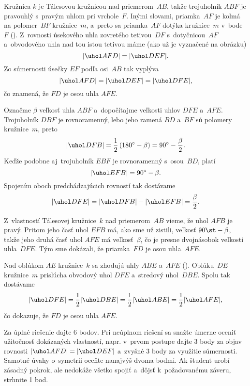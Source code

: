 {%
Kružnica $k$ je Tálesovou kružnicou nad priemerom~$AB$, takže
trojuholník $ABF$ je pravouhlý s~pravým uhlom pri vrchole~$F$. Inými
%
slovami, priamka~$AF$ je kolmá na polomer~$BF$ kružnice~$m$, a~preto sa
priamka~$AF$ dotýka kružnice~$m$ v~bode~$F$ (\obr).
Z~rovnosti úsekového uhla zovretého tetivou~$DF$ s~dotyčnicou~$AF$
a~obvodového uhla nad tou istou tetivou máme (ako už je vyznačené na
obrázku)
$$
|\uhol AFD| = |\uhol DEF|. %
$$
Zo súmernosti úsečky $EF$ podľa osi~$AB$ tak vyplýva
$$
\postdisplaypenalty 10000
|\uhol AFD| = |\uhol DEF| = |\uhol DFE|,
$$
čo znamená, že $FD$ je osou uhla $AFE$.


\ineriesenie
Označme $\beta$ veľkosť uhla $ABF$ a~dopočítajme veľkosti
uhlov $DFE$ a~$AFE$. Trojuholník $DBF$ je rovnoramenný, lebo
jeho ramená $BD$ a~$BF$ sú polomery kružnice~$m$, preto
$$
|\uhol DFB| = \frac {1} {2} \left (180^\circ- \beta \right) = 90^\circ- \frac {\beta} {2}.
$$
Keďže podobne aj~trojuholník $EBF$ je rovnoramenný s~osou~$BD$, platí
$$
|\uhol EFB| = 90^\circ- \beta. %
$$
Spojením oboch predchádzajúcich rovností tak dostávame
$$
|\uhol DFE| = |\uhol DFB|-|\uhol EFB| = \frac {\beta} {2}. %
$$

Z~vlastností Tálesovej kružnice~$k$ nad priemerom~$AB$ vieme, že uhol
$AFB$ je pravý. Pritom jeho časť uhol $EFB$ má, ako sme už zistili,
veľkosť $90\st-\beta$, takže jeho druhá časť uhol $AFE$ má veľkosť~$\beta$,
čo je presne dvojnásobok veľkosti uhla~$DFE$. Tým sme dokázali, že
priamka~$FD$ je osou uhla~$AFE$.

\ineriesenie
Nad oblúkom $AE$ kružnice~$k$ sa zhodujú uhly $ABE$ a~$AFE$ (\obr).
Oblúku~$DE$ kružnice~$m$ prislúcha obvodový uhol $DFE$ a~stredový
uhol~$DBE$. Spolu tak dostávame
$$
|\uhol DFE|=\frac12|\uhol DBE|=\frac12|\uhol ABE|=\frac12|\uhol AFE|,
$$
čo dokazuje, že $FD$ je osou uhla $AFE$.
%

\nobreak\medskip\petit\noindent
Za úplné riešenie dajte 6 bodov.
Pri neúplnom riešení sa snažte úmerne oceniť užitočnosť dokázaných vlastností,
napr. v~prvom postupe dajte 3 body za objav rovnosti $|\uhol AFD| = |\uhol DEF|$
a~zvyšné 3 body za využitie súmernosti. Samotné úvahy o~symetrii
oceňte nanajvýš dvoma bodmi.
Ak študent urobí zásadný pokrok, ale nedokáže všetko spojiť a~dôjsť
k~požadovanému záveru, strhnite 1 bod.
\endpetit
\bigbreak
}

